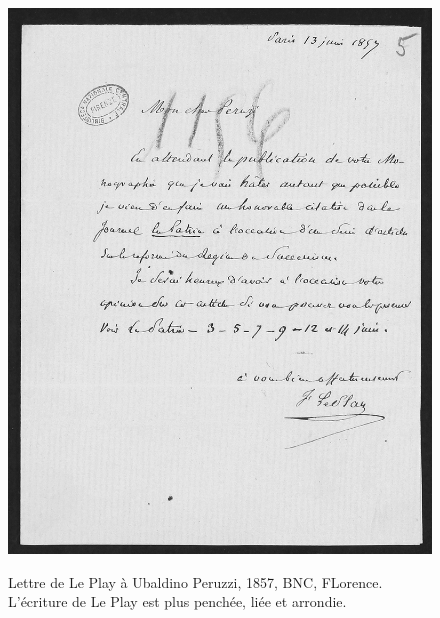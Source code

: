 \begin{figure}[H]
    \centering
    \caption{Lettre de Le Play à Ubaldino Peruzzi, 1857, BNC, FLorence. L'écriture de Le Play est plus penchée, liée et arrondie.}
    \includegraphics[width=15cm]{images/u peruzzi xxxi ins 37 (7).jpg}
    \label{peruzzi}
\end{figure}
